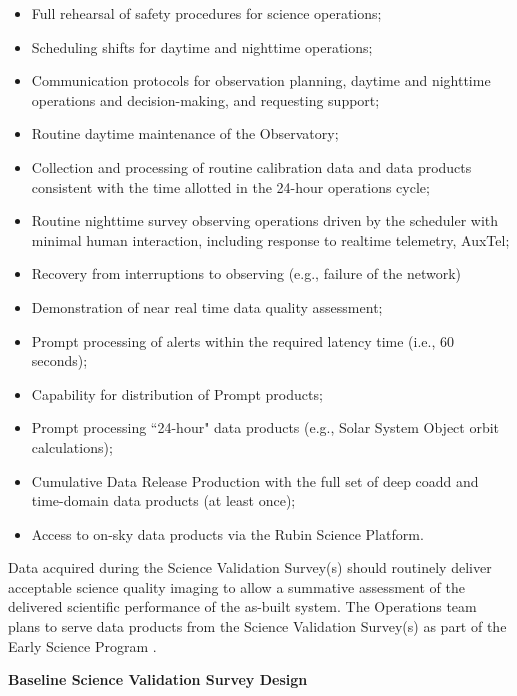 \begin{itemize}
\item Full rehearsal of safety procedures for science operations;
\item Scheduling shifts for daytime and nighttime operations;
\item Communication protocols for observation planning, daytime and nighttime operations and decision-making, and requesting support;
\item Routine daytime maintenance of the Observatory;
\item Collection and processing of routine calibration data and data products consistent with the time allotted in the 24-hour operations cycle;
\item Routine nighttime survey observing operations driven by the scheduler with minimal human interaction, including response to realtime telemetry, AuxTel;
\item Recovery from interruptions to observing (e.g., failure of the network)
\item Demonstration of near real time data quality assessment;
\item Prompt processing of alerts within the required latency time (i.e., 60 seconds);
\item Capability for distribution of Prompt products;
\item Prompt processing ``24-hour" data products (e.g., Solar System Object orbit calculations);
\item Cumulative Data Release Production with the full set of deep coadd and time-domain data products (at least once);
\item Access to on-sky data products via the Rubin Science Platform.
\end{itemize}

Data acquired during the Science Validation Survey(s) should routinely deliver acceptable science quality imaging to allow a summative assessment of the delivered scientific performance of the as-built system.
The Operations team plans to serve data products from the Science Validation Survey(s) as part of the Early Science Program .


\textbf{Baseline Science Validation Survey Design}

